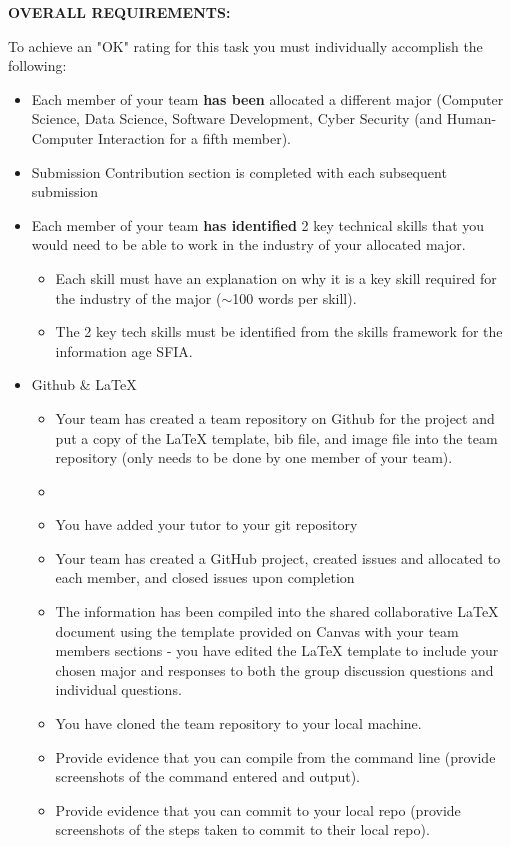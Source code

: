 \documentclass[a4paper, 11pt]{report}
\begin{document}
\textbf{OVERALL REQUIREMENTS:}

To achieve an "OK" rating for this task you must individually accomplish the following:
\begin{itemize}
\item Each member of your team \textbf{has been} allocated a different major (Computer Science, Data Science, Software Development, Cyber Security (and Human-Computer Interaction for a fifth member).
\item Submission Contribution section is completed with each subsequent submission
\item Each member of your team \textbf{has identified} 2 key technical skills that you would need to be able to work in the industry of your allocated major.
	\begin{itemize}
	\item Each skill must have an explanation on why it is a key skill required for the industry of the major ($\sim$100 words per skill).
	\item The 2 key tech skills must be identified from the skills framework for the information age SFIA.
	\end{itemize}
\item Github \& LaTeX
	\begin{itemize}
	\item Your team has created a team repository on Github for the project and put a copy of the LaTeX template, bib file, and image file into the team repository (only needs to be done by one member of your team).
    \item \item You have added your tutor to your git repository
    \item Your team has created a GitHub project, created issues and allocated to each member, and closed issues upon completion
	\item The information has been compiled into the shared collaborative LaTeX document using the template provided on Canvas with your team members sections - you have edited the LaTeX template to include your chosen major and responses to both the group discussion questions and individual questions.
	\item You have cloned the team repository to your local machine.
	\item Provide evidence that you can compile from the command line (provide screenshots of the command entered and output).
	\item Provide evidence that you can commit to your local repo (provide screenshots of the steps taken to commit to their local repo).

\end{itemize}
\end{itemize}
\end{document}
